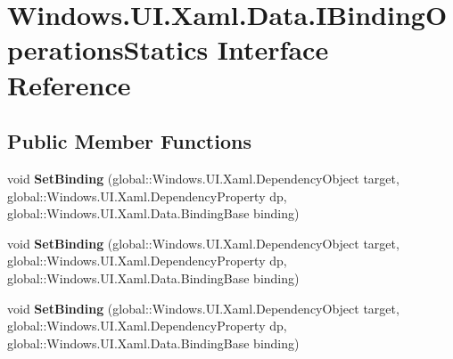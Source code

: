 \hypertarget{interface_windows_1_1_u_i_1_1_xaml_1_1_data_1_1_i_binding_operations_statics}{}\section{Windows.\+U\+I.\+Xaml.\+Data.\+I\+Binding\+Operations\+Statics Interface Reference}
\label{interface_windows_1_1_u_i_1_1_xaml_1_1_data_1_1_i_binding_operations_statics}
\subsection*{Public Member Functions}
\begin{DoxyCompactItemize}
\item 
\mbox{\label{interface_windows_1_1_u_i_1_1_xaml_1_1_data_1_1_i_binding_operations_statics_a525ee1b6596932ce7df82780a243635b}} 
void {\bfseries Set\+Binding} (global\+::\+Windows.\+U\+I.\+Xaml.\+Dependency\+Object target, global\+::\+Windows.\+U\+I.\+Xaml.\+Dependency\+Property dp, global\+::\+Windows.\+U\+I.\+Xaml.\+Data.\+Binding\+Base binding)
\item 
\mbox{\label{interface_windows_1_1_u_i_1_1_xaml_1_1_data_1_1_i_binding_operations_statics_a525ee1b6596932ce7df82780a243635b}} 
void {\bfseries Set\+Binding} (global\+::\+Windows.\+U\+I.\+Xaml.\+Dependency\+Object target, global\+::\+Windows.\+U\+I.\+Xaml.\+Dependency\+Property dp, global\+::\+Windows.\+U\+I.\+Xaml.\+Data.\+Binding\+Base binding)
\item 
\mbox{\label{interface_windows_1_1_u_i_1_1_xaml_1_1_data_1_1_i_binding_operations_statics_a525ee1b6596932ce7df82780a243635b}} 
void {\bfseries Set\+Binding} (global\+::\+Windows.\+U\+I.\+Xaml.\+Dependency\+Object target, global\+::\+Windows.\+U\+I.\+Xaml.\+Dependency\+Property dp, global\+::\+Windows.\+U\+I.\+Xaml.\+Data.\+Binding\+Base binding)
\item 
\mbox{\label{interface_windows_1_1_u_i_1_1_xaml_1_1_data_1_1_i_binding_operations_statics_a525ee1b6596932ce7df82780a243635b}} 

\end{DoxyCompactItemize}

